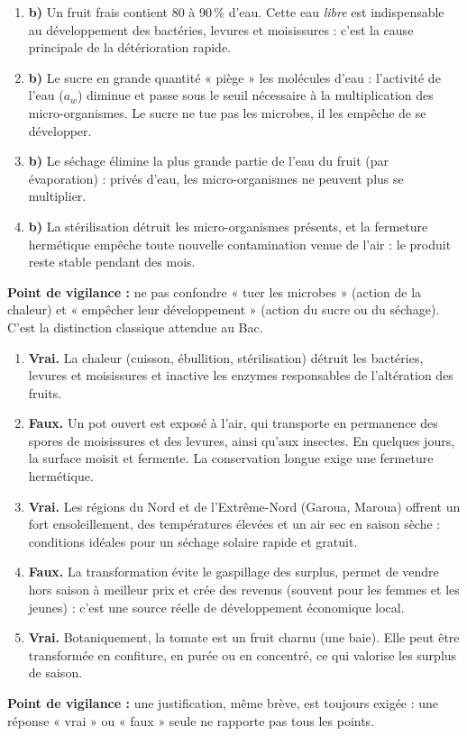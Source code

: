 \documentclass[11pt]{article}
\begin{document}
\begin{corrige}
\begin{enumerate}
\item \textbf{b)} Un fruit frais contient 80 à 90\,\% d'eau. Cette eau \emph{libre} est indispensable au développement des bactéries, levures et moisissures : c'est la cause principale de la détérioration rapide.
\item \textbf{b)} Le sucre en grande quantité « piège » les molécules d'eau : l'activité de l'eau ($a_w$) diminue et passe sous le seuil nécessaire à la multiplication des micro-organismes. Le sucre ne tue pas les microbes, il les empêche de se développer.
\item \textbf{b)} Le séchage élimine la plus grande partie de l'eau du fruit (par évaporation) : privés d'eau, les micro-organismes ne peuvent plus se multiplier.
\item \textbf{b)} La stérilisation détruit les micro-organismes présents, et la fermeture hermétique empêche toute nouvelle contamination venue de l'air : le produit reste stable pendant des mois.
\end{enumerate}
\textbf{Point de vigilance :} ne pas confondre « tuer les microbes » (action de la chaleur) et « empêcher leur développement » (action du sucre ou du séchage). C'est la distinction classique attendue au Bac.
\end{corrige}

\begin{corrige}
\begin{enumerate}
\item \textbf{Vrai.} La chaleur (cuisson, ébullition, stérilisation) détruit les bactéries, levures et moisissures et inactive les enzymes responsables de l'altération des fruits.
\item \textbf{Faux.} Un pot ouvert est exposé à l'air, qui transporte en permanence des spores de moisissures et des levures, ainsi qu'aux insectes. En quelques jours, la surface moisit et fermente. La conservation longue exige une fermeture hermétique.
\item \textbf{Vrai.} Les régions du Nord et de l'Extrême-Nord (Garoua, Maroua) offrent un fort ensoleillement, des températures élevées et un air sec en saison sèche : conditions idéales pour un séchage solaire rapide et gratuit.
\item \textbf{Faux.} La transformation évite le gaspillage des surplus, permet de vendre hors saison à meilleur prix et crée des revenus (souvent pour les femmes et les jeunes) : c'est une source réelle de développement économique local.
\item \textbf{Vrai.} Botaniquement, la tomate est un fruit charnu (une baie). Elle peut être transformée en confiture, en purée ou en concentré, ce qui valorise les surplus de saison.
\end{enumerate}
\textbf{Point de vigilance :} une justification, même brève, est toujours exigée : une réponse « vrai » ou « faux » seule ne rapporte pas tous les points.
\end{corrige}
\end{document}
